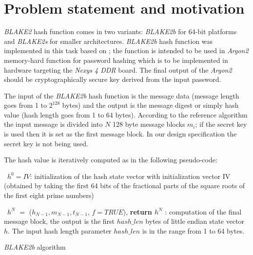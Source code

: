 \documentclass[%
	a4paper,
]
{article}
\begin{document}
\section{Problem statement and motivation}
\label{sec:problem}
\emph{BLAKE2} hash function comes in two variants: \emph{BLAKE2b} for 64-bit platforms and \emph{BLAKE2s} for smaller architectures. \emph{BLAKE2b} hash function was implemented in this task based on \autocite{rfc7693}; the function is intended to be used in \emph{Argon2} memory-hard function for password hashing \autocite{irtf-cfrg-argon2-03} which is to be implemented in hardware targeting the \emph{Nexys 4 DDR} board. The final output of the \emph{Argon2} should be cryptographically secure key derived from the input password.
	
The input of the \emph{BLAKE2b} hash function is the message data (message length goes from 1 to $2^{128}$ bytes) and the output is the message digest or simply hash value (hash length goes from 1 to 64 bytes). According to the reference algorithm the input message is divided into $N$ 128 byte message blocks $m_i$; if the secret key is used then it is set as the first message block. In our design specification the secret key is not being used.

The hash value is iteratively computed as in the following pseudo-code:

\begin{algorithm}

	\ $h^{0}=IV$: initialization of the hash state vector with initialization vector IV (obtained by taking the first 64 bits of the fractional parts of the square roots of the first eight prime numbers)
	\BlankLine
	
	
	\BlankLine
	\ $h^{N}$ $=$ ($h_{N-1}, m_{N-1},t_{N-1}$, $f=TRUE $), \textbf{ return $h^{N}$ } : computation of the final message block, the output is the first $hash\_len$ bytes of little endian state vector $h$. The input hash length parameter $hash\_len$ is in the range from 1 to 64 bytes.
	
	\caption{\emph{BLAKE2b} algorithm}
	\label{alg:bbs}
	
\end{algorithm}
\end{document}
